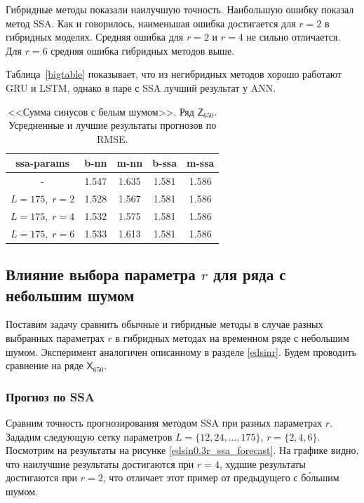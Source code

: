 \documentclass[specialist,
               substylefile = spbu.rtx,
               subf,href,colorlinks=true, 12p]{disser}
\begin{document}
Гибридные методы показали наилучшую точность. Наибольшую ошибку показал метод SSA. Как и говорилось, наименьшая ошибка достигается для $r = 2$ в гибридных моделях. Средняя ошибка для $r = 2$ и $r = 4$ не сильно отличается. Для $r = 6$ средняя ошибка гибридных методов выше.

Таблица~\ref{bigtable} показывает, что из негибридных методов хорошо работают GRU и LSTM, однако в паре с SSA лучший результат у ANN.

\begin{table}[H]
	\captionsetup{justification=centering}
	\caption{<<Сумма синусов с белым шумом>>. Ряд $\mathsf{Z}_{650}$. Усредненные и лучшие результаты прогнозов по RMSE.}
	\begin{center}
		\begin{tabular}{ccccc}
			\toprule
			{ssa-params} &  b-nn &  m-nn &  b-ssa &  m-ssa \\
			\midrule
			-          & 1.547 & 1.635 &  1.581 &  1.586 \\
			$ L = 175, \; r = 2$         & 1.528 & 1.567 &  1.581 &  1.586 \\
			$ L = 175, \; r = 4$        & 1.532 & 1.575 &  1.581 &  1.586 \\
			$ L = 175, \; r = 6$        & 1.533 & 1.613 &  1.581 &  1.586 \\
			\bottomrule
		\end{tabular}
	\end{center}
	\label{tedsiner}
\end{table}


\subsection{Влияние выбора параметра $r$ для ряда с небольшим шумом}
\label{edsinr_lownoise}
Поставим задачу сравнить обычные и гибридные методы в случае разных выбранных параметрах $r$ в гибридных методах на временном ряде с небольшим шумом. Эксперимент аналогичен описанному в разделе \ref{edsinr}. Будем проводить сравнение на ряде $\mathsf{X}_{650}$.

\subsubsection{Прогноз по SSA}

Сравним точность прогнозирования методом SSA при разных параметрах $r$. Зададим следующую сетку параметров $L = \{12, 24, \ldots, 175\}$, $r = \{2, 4, 6\}$. Посмотрим на результаты на рисунке \ref{edsin0.3r_ssa_forecast}. На графике видно, что наилучшие результаты достигаются при $r = 4$, худшие результаты достигаются при $r = 2$, что отличает этот пример от предыдущего с б\'{о}льшим шумом.
\end{document}
